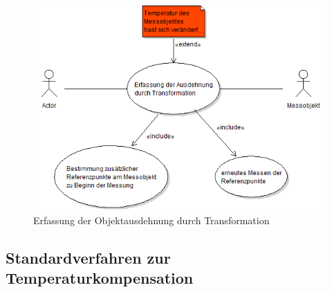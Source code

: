 \begin{figure}[h]
	\label{fig:ausdehnungtransformation}
	\centering
		\includegraphics[scale=0.5]{UMLDiagramme/erfassungAusdehnungTransformation}
	\caption{Erfassung der Objektausdehnung durch Transformation}
\end{figure}

\subsection{Standardverfahren zur Temperaturkompensation}\label{sec:standardtempcomp}

